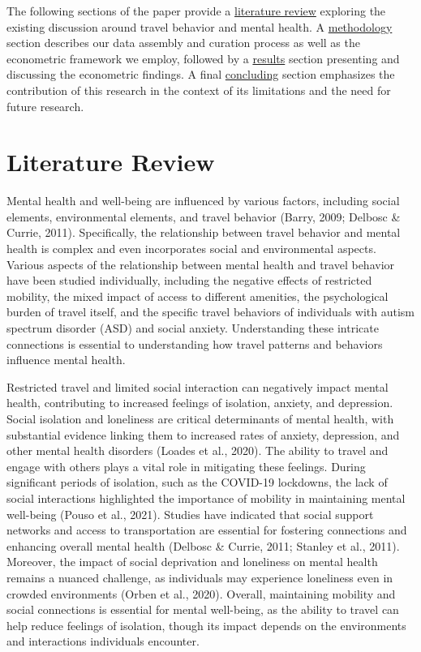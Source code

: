 \documentclass[
  letterpaper,
  number,
  review,
  3p]{elsarticle}
\begin{document}
The following sections of the paper provide a
\href{@sec-litreview}{literature review} exploring the existing
discussion around travel behavior and mental health. A
\href{@sec-methods}{methodology} section describes our data assembly and
curation process as well as the econometric framework we employ,
followed by a \href{@sec-results}{results} section presenting and
discussing the econometric findings. A final
\href{@sec-conclude}{concluding} section emphasizes the contribution of
this research in the context of its limitations and the need for future
research.


\section{Literature Review}\label{sec-litreview}

Mental health and well-being are influenced by various factors,
including social elements, environmental elements, and travel behavior
(Barry, 2009; Delbosc \& Currie, 2011). Specifically, the relationship
between travel behavior and mental health is complex and even
incorporates social and environmental aspects. Various aspects of the
relationship between mental health and travel behavior have been studied
individually, including the negative effects of restricted mobility, the
mixed impact of access to different amenities, the psychological burden
of travel itself, and the specific travel behaviors of individuals with
autism spectrum disorder (ASD) and social anxiety. Understanding these
intricate connections is essential to understanding how travel patterns
and behaviors influence mental health.

Restricted travel and limited social interaction can negatively impact
mental health, contributing to increased feelings of isolation, anxiety,
and depression. Social isolation and loneliness are critical
determinants of mental health, with substantial evidence linking them to
increased rates of anxiety, depression, and other mental health
disorders (Loades et al., 2020). The ability to travel and engage with
others plays a vital role in mitigating these feelings. During
significant periods of isolation, such as the COVID-19 lockdowns, the
lack of social interactions highlighted the importance of mobility in
maintaining mental well-being (Pouso et al., 2021). Studies have
indicated that social support networks and access to transportation are
essential for fostering connections and enhancing overall mental health
(Delbosc \& Currie, 2011; Stanley et al., 2011). Moreover, the impact of
social deprivation and loneliness on mental health remains a nuanced
challenge, as individuals may experience loneliness even in crowded
environments (Orben et al., 2020). Overall, maintaining mobility and
social connections is essential for mental well-being, as the ability to
travel can help reduce feelings of isolation, though its impact depends
on the environments and interactions individuals encounter.
\end{document}

